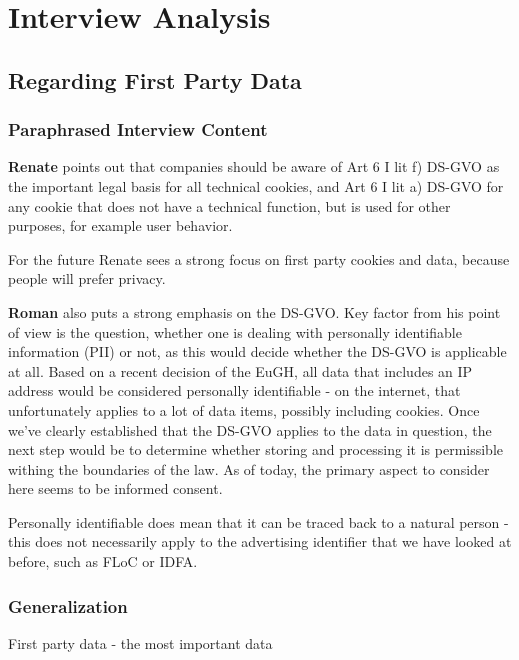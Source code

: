 %
%

\pagebreak
\section{Interview Analysis}

\onehalfspacing

\subsection{Regarding First Party Data}

\subsubsection{Paraphrased Interview Content}

\textbf{Renate} points out that companies should be aware of Art 6 I lit f) DS-GVO as the important legal basis for all technical cookies, and Art 6 I lit a) DS-GVO for any cookie that does not have a technical function, but is used for other purposes, for example user behavior.

For the future Renate sees a strong focus on first party cookies and data, because people will prefer privacy.

\textbf{Roman} also puts a strong emphasis on the DS-GVO. Key factor from his point of view is the question, whether one is dealing with personally identifiable information (PII) or not, as this would decide whether the DS-GVO is applicable at all. Based on a recent decision of the EuGH, all data that includes an IP address would be considered personally identifiable - on the internet, that unfortunately applies to a lot of data items, possibly including cookies. Once we've clearly established that the DS-GVO applies to the data in question, the next step would be to determine whether storing and processing it is permissible withing the boundaries of the law. As of today, the primary aspect to consider here seems to be informed consent.

Personally identifiable does mean that it can be traced back to a natural person - this does not necessarily apply to the advertising identifier that we have looked at before, such as FLoC or IDFA.

\subsubsection{Generalization}

First party data - the most important data

